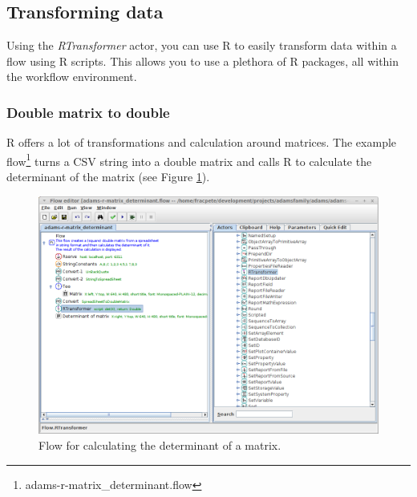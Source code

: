 \documentclass[a4paper]{book}
\begin{document}
\clearpage
\subsection{Transforming data}
Using the \textit{RTransformer} actor, you can use R to easily transform
data within a flow using R scripts. This allows you to use a plethora
of R packages, all within the workflow environment.

\subsubsection{Double matrix to double}
R offers a lot of transformations and calculation around matrices. The example
flow\footnote{adams-r-matrix\_determinant.flow} turns a CSV string into a
double matrix and calls R to calculate the determinant of the matrix (see
Figure \ref{matrix_determinant-flow}).
\begin{figure}[ht]
	\centering
	\includegraphics[width=12cm]{images/matrix_determinant-flow.png}
	\caption{Flow for calculating the determinant of a matrix.}
	\label{matrix_determinant-flow}
\end{figure}

\clearpage
\end{document}

